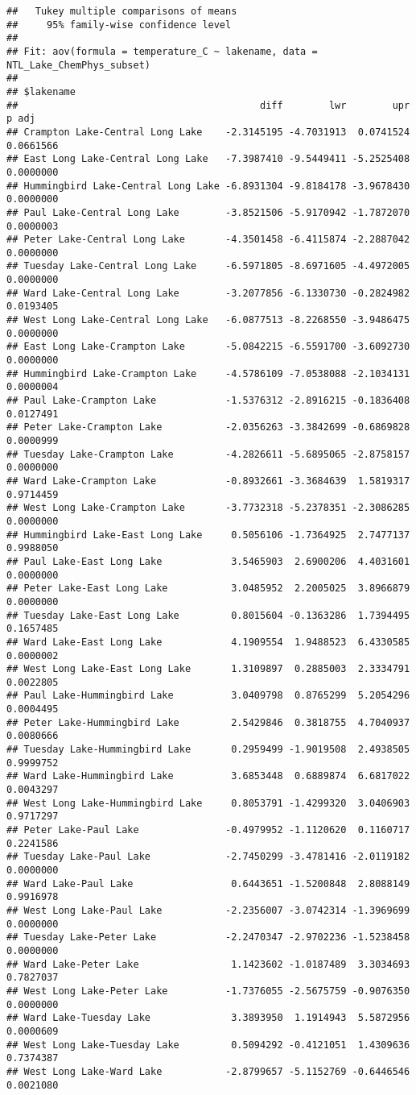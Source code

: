 \documentclass[
]{article}
\begin{document}
\begin{verbatim}
##   Tukey multiple comparisons of means
##     95% family-wise confidence level
## 
## Fit: aov(formula = temperature_C ~ lakename, data = NTL_Lake_ChemPhys_subset)
## 
## $lakename
##                                          diff        lwr        upr     p adj
## Crampton Lake-Central Long Lake    -2.3145195 -4.7031913  0.0741524 0.0661566
## East Long Lake-Central Long Lake   -7.3987410 -9.5449411 -5.2525408 0.0000000
## Hummingbird Lake-Central Long Lake -6.8931304 -9.8184178 -3.9678430 0.0000000
## Paul Lake-Central Long Lake        -3.8521506 -5.9170942 -1.7872070 0.0000003
## Peter Lake-Central Long Lake       -4.3501458 -6.4115874 -2.2887042 0.0000000
## Tuesday Lake-Central Long Lake     -6.5971805 -8.6971605 -4.4972005 0.0000000
## Ward Lake-Central Long Lake        -3.2077856 -6.1330730 -0.2824982 0.0193405
## West Long Lake-Central Long Lake   -6.0877513 -8.2268550 -3.9486475 0.0000000
## East Long Lake-Crampton Lake       -5.0842215 -6.5591700 -3.6092730 0.0000000
## Hummingbird Lake-Crampton Lake     -4.5786109 -7.0538088 -2.1034131 0.0000004
## Paul Lake-Crampton Lake            -1.5376312 -2.8916215 -0.1836408 0.0127491
## Peter Lake-Crampton Lake           -2.0356263 -3.3842699 -0.6869828 0.0000999
## Tuesday Lake-Crampton Lake         -4.2826611 -5.6895065 -2.8758157 0.0000000
## Ward Lake-Crampton Lake            -0.8932661 -3.3684639  1.5819317 0.9714459
## West Long Lake-Crampton Lake       -3.7732318 -5.2378351 -2.3086285 0.0000000
## Hummingbird Lake-East Long Lake     0.5056106 -1.7364925  2.7477137 0.9988050
## Paul Lake-East Long Lake            3.5465903  2.6900206  4.4031601 0.0000000
## Peter Lake-East Long Lake           3.0485952  2.2005025  3.8966879 0.0000000
## Tuesday Lake-East Long Lake         0.8015604 -0.1363286  1.7394495 0.1657485
## Ward Lake-East Long Lake            4.1909554  1.9488523  6.4330585 0.0000002
## West Long Lake-East Long Lake       1.3109897  0.2885003  2.3334791 0.0022805
## Paul Lake-Hummingbird Lake          3.0409798  0.8765299  5.2054296 0.0004495
## Peter Lake-Hummingbird Lake         2.5429846  0.3818755  4.7040937 0.0080666
## Tuesday Lake-Hummingbird Lake       0.2959499 -1.9019508  2.4938505 0.9999752
## Ward Lake-Hummingbird Lake          3.6853448  0.6889874  6.6817022 0.0043297
## West Long Lake-Hummingbird Lake     0.8053791 -1.4299320  3.0406903 0.9717297
## Peter Lake-Paul Lake               -0.4979952 -1.1120620  0.1160717 0.2241586
## Tuesday Lake-Paul Lake             -2.7450299 -3.4781416 -2.0119182 0.0000000
## Ward Lake-Paul Lake                 0.6443651 -1.5200848  2.8088149 0.9916978
## West Long Lake-Paul Lake           -2.2356007 -3.0742314 -1.3969699 0.0000000
## Tuesday Lake-Peter Lake            -2.2470347 -2.9702236 -1.5238458 0.0000000
## Ward Lake-Peter Lake                1.1423602 -1.0187489  3.3034693 0.7827037
## West Long Lake-Peter Lake          -1.7376055 -2.5675759 -0.9076350 0.0000000
## Ward Lake-Tuesday Lake              3.3893950  1.1914943  5.5872956 0.0000609
## West Long Lake-Tuesday Lake         0.5094292 -0.4121051  1.4309636 0.7374387
## West Long Lake-Ward Lake           -2.8799657 -5.1152769 -0.6446546 0.0021080
\end{verbatim}
\end{document}

